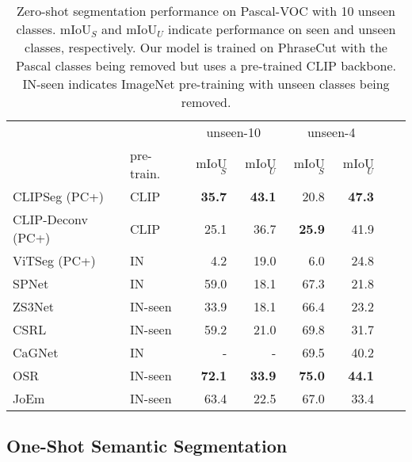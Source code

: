 \documentclass[10pt,twocolumn,letterpaper]{article}
\begin{document}
\begin{table}[]
    \centering
    \footnotesize
    \setlength{\tabcolsep}{1.5mm}
    \begin{tabular}{ll|rr|rrll}
         \toprule
         && \multicolumn{2}{c|}{unseen-10} & \multicolumn{2}{c}{unseen-4} \\
        & pre-train. & mIoU$_S$ & mIoU$_U$ & mIoU$_S$ & mIoU$_U$  \\
        \midrule
CLIPSeg (PC+) & CLIP &  \textbf{35.7} & \textbf{43.1} & 20.8 & \textbf{47.3} \\
CLIP-Deconv (PC+) & CLIP &  25.1 & 36.7 & \textbf{25.9} & 41.9 \\
ViTSeg (PC+) & IN &  4.2 & 19.0 & 6.0 & 24.8 \\
        \midrule
        \midrule
        SPNet \cite{xian19} & IN & 59.0 & 18.1 & 67.3 & 21.8 \\
        ZS3Net \cite{bucher19} & IN-seen & 33.9 & 18.1 & 66.4 & 23.2 \\
        CSRL \cite{li20consistent}  & IN-seen  & 59.2 & 21.0 & 69.8 & 31.7  \\
        CaGNet \cite{gu2020context} & IN & - & - & 69.5 & 40.2 \\
        OSR \cite{zhang21} & IN-seen &  \textbf{72.1} & \textbf{33.9} & \textbf{75.0} & \textbf{44.1} \\
        JoEm \cite{baek21} & IN-seen & 63.4 & 22.5 & 67.0 & 33.4  \\
        \bottomrule
    \end{tabular}\caption{Zero-shot segmentation performance on Pascal-VOC with 10 unseen classes. mIoU$_S$ and mIoU$_U$ indicate performance on seen and unseen classes, respectively. Our model is trained on PhraseCut with the Pascal classes being removed but uses a pre-trained CLIP backbone. IN-seen indicates ImageNet pre-training with unseen classes being removed.}
    \label{tab:zero_shot_performance}
\end{table}
















\subsection{One-Shot Semantic Segmentation}
\end{document}
